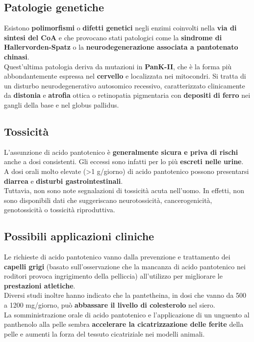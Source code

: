 \documentclass[a4paper, 12pt]{article}
\begin{document}
\subsection{Patologie genetiche}
Esistono \textbf{polimorfismi} o \textbf{difetti genetici} negli enzimi coinvolti nella \textbf{via di sintesi del CoA} e che provocano stati patologici come la \textbf{sindrome di Hallervorden-Spatz} o la \textbf{neurodegenerazione associata a pantotenato chinasi}.\\
Quest'ultima patologia deriva da mutazioni in \textbf{PanK-II}, che è la forma più abbondantemente espressa nel \textbf{cervello} e localizzata nei mitocondri. Si tratta di un disturbo neurodegenerativo autosomico recessivo, caratterizzato clinicamente da \textbf{distonia} e \textbf{atrofia} ottica o retinopatia pigmentaria con \textbf{depositi di ferro} nei gangli della base e nel globus pallidus.

\subsection{Tossicità}
L’assunzione di acido pantotenico è \textbf{generalmente sicura e priva di rischi} anche a dosi consistenti. Gli eccessi sono infatti per lo più \textbf{escreti nelle urine}.\\
A dosi orali molto elevate (\textgreater 1 g/giorno) di acido pantotenico possono presentarsi \textbf{diarrea} e \textbf{disturbi gastrointestinali}.\\ Tuttavia, non sono note segnalazioni di tossicità acuta nell'uomo. In effetti, non sono disponibili dati che suggeriscano neurotossicità, cancerogenicità, genotossicità o tossicità riproduttiva.

\subsection{Possibili applicazioni cliniche}
Le richieste di acido pantotenico vanno dalla prevenzione e trattamento dei \textbf{capelli grigi} (basato sull’osservazione che la mancanza di acido pantotenico nei roditori provoca ingrigimento della pelliccia) all’utilizzo per migliorare le \textbf{prestazioni atletiche}.\\
Diversi studi inoltre hanno indicato che la pantetheina, in dosi che vanno da 500 a 1200 mg/giorno, può \textbf{abbassare il livello di colesterolo} nel siero.\\
La somministrazione orale di acido pantotenico e l’applicazione di un unguento al panthenolo alla pelle sembra \textbf{accelerare la cicatrizzazione delle ferite} della pelle e aumenti la forza del tessuto cicatriziale nei modelli animali.
\end{document}
